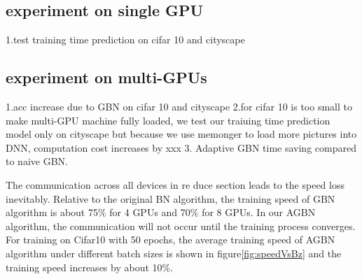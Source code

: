 
\subsection{experiment on single GPU}

1.test training time prediction on cifar 10 and cityscape

\subsection{experiment on multi-GPUs}

1.acc increase due to GBN on cifar 10 and cityscape
2.for cifar 10 is too small to make multi-GPU machine fully loaded, we test our traiuing time prediction model only on cityscape
but because we use memonger to load more pictures into DNN, computation cost increases by xxx
3. Adaptive GBN time saving compared to naive GBN.



The communication across all devices in re duce section leads to the speed loss inevitably. Relative to the original BN algorithm, the training speed of GBN algorithm is about 75\% for 4 GPUs and 70\% for 8 GPUs. In our AGBN algorithm, the communication will not occur until the training process converges. For training on Cifar10 with 50 epochs, the average training speed of AGBN algorithm under different batch sizes is shown in figure\ref{fig:speedVsBz} and the training speed increases by about 10\%.



